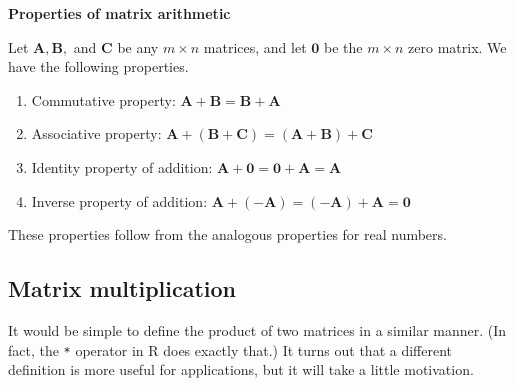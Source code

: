 \documentclass[
]{book}
\theoremstyle{definition}
\theoremstyle{definition}
\theoremstyle{definition}
\theoremstyle{definition}
\theoremstyle{remark}
\begin{document}
\begin{propbox}

\textbf{Properties of matrix arithmetic}

Let \(\mathbf{A}, \mathbf{B},\) and \(\mathbf{C}\) be any \(m\times n\) matrices, and let \(\mathbf{0}\) be the \(m\times n\) zero matrix. We have the following properties.

\begin{enumerate}
\def\labelenumi{\arabic{enumi}.}
\item
  Commutative property: \(\mathbf{A}+\mathbf{B}=\mathbf{B}+\mathbf{A}\)
\item
  Associative property: \(\mathbf{A}+(\mathbf{B}+\mathbf{C})=(\mathbf{A}+\mathbf{B})+\mathbf{C}\)
\item
  Identity property of addition: \(\mathbf{A}+\mathbf{0}=\mathbf{0}+\mathbf{A}=\mathbf{A}\)
\item
  Inverse property of addition: \(\mathbf{A}+(-\mathbf{A})=(-\mathbf{A})+\mathbf{A}=\mathbf{0}\)
\end{enumerate}

\end{propbox}

These properties follow from the analogous properties for real numbers.

\subsection*{Matrix multiplication}\label{matrix-multiplication}

It would be simple to define the product of two matrices in a similar manner. (In fact, the \texttt{*} operator in R does exactly that.) It turns out that a different definition is more useful for applications, but it will take a little motivation.
\end{document}
